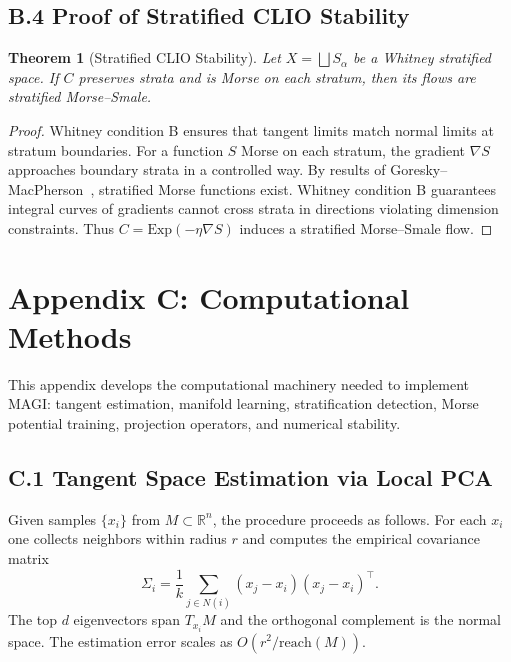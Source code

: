 \documentclass[11pt,a4paper,twocolumn]{article}
\newtheorem*{theorem*}{Theorem}
\begin{document}
\subsection*{B.4 Proof of Stratified CLIO Stability}

\begin{theorem*}[Stratified CLIO Stability]
Let $X = \bigsqcup S_\alpha$ be a Whitney stratified space. If $C$
preserves strata and is Morse on each stratum, then its flows are
stratified Morse--Smale.
\end{theorem*}

\begin{proof}
Whitney condition B ensures that tangent limits match normal limits at
stratum boundaries. For a function $S$ Morse on each stratum, the
gradient $\nabla S$ approaches boundary strata in a controlled way. By
results of Goresky--MacPherson~\cite{goresky-macpherson}, stratified
Morse functions exist. Whitney condition B guarantees integral curves of
gradients cannot cross strata in directions violating dimension
constraints. Thus $C = \mathrm{Exp}(-\eta\nabla S)$ induces a
stratified Morse--Smale flow.
\end{proof}


\section*{Appendix C: Computational Methods}

This appendix develops the computational machinery needed to implement
MAGI: tangent estimation, manifold learning, stratification detection,
Morse potential training, projection operators, and numerical stability.

\subsection*{C.1 Tangent Space Estimation via Local PCA}

Given samples $\{x_i\}$ from $M \subset \mathbb{R}^n$, the procedure
proceeds as follows. For each $x_i$ one collects neighbors within radius
$r$ and computes the empirical covariance matrix
\[
\Sigma_i = \frac{1}{k}\sum_{j \in N(i)}(x_j - x_i)(x_j - x_i)^{\top}.
\]
The top $d$ eigenvectors span $T_{x_i}M$ and the orthogonal complement
is the normal space. The estimation error scales as
$O\!\left(r^2/\mathrm{reach}(M)\right)$.
\end{document}
